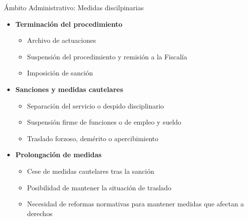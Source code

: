 \documentclass{beamer}
\begin{document}
    \begin{frame}{Ámbito Administrativo: Medidas discilpinarias}
        \begin{itemize}
            \item \textbf{Terminación del procedimiento}
            \begin{itemize}
                \item Archivo de actuaciones
                \item Suspensión del procedimiento y remisión a la Fiscalía
                \item Imposición de sanción
            \end{itemize}
            \item \textbf{Sanciones y medidas cautelares}
            \begin{itemize}
                \item Separación del servicio o despido disciplinario
                \item Suspensión firme de funciones o de empleo y sueldo
                \item Traslado forzoso, demérito o apercibimiento
            \end{itemize}
            \item \textbf{Prolongación de medidas}
            \begin{itemize}
                \item Cese de medidas cautelares tras la sanción
                \item Posibilidad de mantener la situación de traslado
                \item Necesidad de reformas normativas para mantener medidas que afectan a derechos
            \end{itemize}
        \end{itemize}
    \end{frame}
\end{document}
